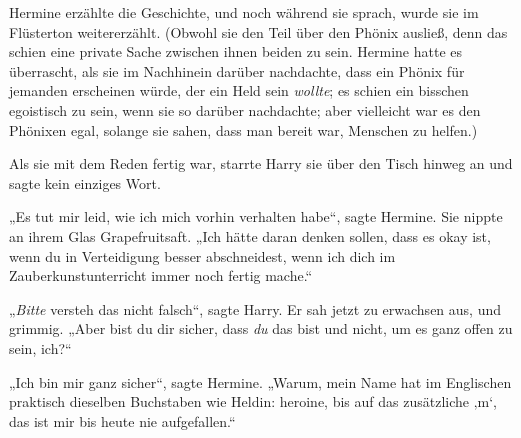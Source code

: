 Hermine erzählte die Geschichte, und noch während sie sprach, wurde sie im Flüsterton weitererzählt. (Obwohl sie den Teil über den Phönix ausließ, denn das schien eine private Sache zwischen ihnen beiden zu sein. Hermine hatte es überrascht, als sie im Nachhinein darüber nachdachte, dass ein Phönix für jemanden erscheinen würde, der ein Held sein \emph{wollte}; es schien ein bisschen egoistisch zu sein, wenn sie so darüber nachdachte; aber vielleicht war es den Phönixen egal, solange sie sahen, dass man bereit war, Menschen zu helfen.)

Als sie mit dem Reden fertig war, starrte Harry sie über den Tisch hinweg an und sagte kein einziges Wort.

„Es tut mir leid, wie ich mich vorhin verhalten habe“, sagte Hermine. Sie nippte an ihrem Glas Grapefruitsaft. „Ich hätte daran denken sollen, dass es okay ist, wenn du in Verteidigung besser abschneidest, wenn ich dich im Zauberkunstunterricht immer noch fertig mache.“

„\emph{Bitte} versteh das nicht falsch“, sagte Harry. Er sah jetzt zu erwachsen aus, und grimmig. „Aber bist du dir sicher, dass \emph{du} das bist und nicht, um es ganz offen zu sein, ich?“

„Ich bin mir ganz sicher“, sagte Hermine. „Warum, mein Name hat im Englischen praktisch dieselben Buchstaben wie Heldin: heroine, bis auf das zusätzliche ‚m‘, das ist mir bis heute nie aufgefallen.“


